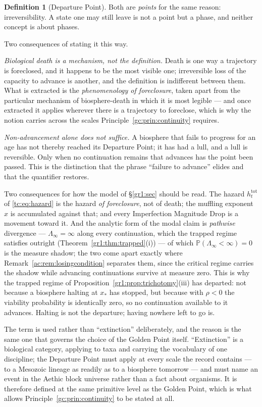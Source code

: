 \documentclass[11pt]{article}
\numberwithin{equation}{section}
\theoremstyle{plain}
\theoremstyle{definition}
\newtheorem{definition}[theorem]{Definition}
\theoremstyle{remark}
\newcommand{\PP}{\mathbb{P}}
\begin{document}
\begin{definition}[Departure Point]
Both are \emph{points} for the same reason: irreversibility. A state
one may still leave is not a point but a phase, and neither concept is
about phases.

Two consequences of stating it this way.

\emph{Biological death is a mechanism, not the definition.} Death is one
way a trajectory is foreclosed, and it happens to be the most visible
one; irreversible loss of the capacity to advance is another, and the
definition is indifferent between them. What is extracted is the
\emph{phenomenology of foreclosure}, taken apart from the particular
mechanism of biosphere-death in which it is most legible --- and once
extracted it applies wherever there is a trajectory to foreclose,
which is why the notion carries across the scales
Principle~\ref{gc:prin:continuity} requires.

\emph{Non-advancement alone does not suffice.} A biosphere that fails
to progress for an age has not thereby reached its Departure Point; it
has had a lull, and a lull is reversible. Only when no continuation
remains that advances has the point been passed. This is the
distinction that the phrase ``failure to advance'' elides and that the
quantifier restores.

Two consequences for how the model of \S\ref{gr1:sec} should be read.
The hazard $h^{\mathrm{tot}}_t$ of \eqref{tc:eq:hazard} is the hazard
\emph{of foreclosure}, not of death; the muffling exponent $x$ is
accumulated against that; and every Imperfection Magnitude Drop is a
movement toward it. And the analytic form of the modal claim is \emph{pathwise}
divergence --- $\Lambda_\infty=\infty$ along every continuation, which
the trapped regime satisfies outright
(Theorem~\ref{gr1:thm:trapped}(i)) --- of which
$\PP(\Lambda_\infty<\infty)=0$ is the measure shadow; the two come
apart exactly where Remark~\ref{ac:rem:losingcondition} separates
them, since the critical regime carries the shadow while advancing
continuations survive at measure zero. This is why the
trapped regime of Proposition~\ref{gr1:prop:trichotomy}(iii) has
departed: not because a biosphere halting at $x_\ast$ has stopped, but
because with $\rho<0$ the viability probability is identically zero, so
no continuation available to it advances. Halting is not the departure;
having nowhere left to go is.

The term is used rather than ``extinction'' deliberately, and the
reason is the same one that governs the choice of the Golden Point
itself. ``Extinction'' is a biological category, applying to taxa and
carrying the vocabulary of one discipline; the Departure Point must
apply at every scale the record contains --- to a Mesozoic lineage as
readily as to a biosphere tomorrow --- and must name an event in the
Aethic block universe rather than a fact about organisms. It is
therefore defined at the same primitive level as the Golden Point,
which is what allows Principle~\ref{gc:prin:continuity} to be stated at
all.


\end{definition}
\end{document}

